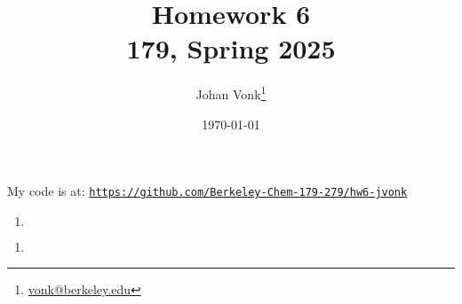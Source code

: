 \documentclass[10pt]{article}
\title{Homework 6\\\large  179, Spring 2025}
\author{Johan Vonk\thanks{\href{mailto:vonk@berkeley.edu}{vonk@berkeley.edu}}}
\date{\today}
\begin{document}
    \maketitle
    My code is at: \href{https://github.com/Berkeley-Chem-179-279/hw6-jvonk}{\texttt{https://github.com/Berkeley-Chem-179-279/hw6-jvonk}}\\
    \begin{problems}
        \item \begin{enumerate}
            \item \begin{align*}
            \end{align*}
        \end{enumerate}
        \item \begin{enumerate}
            \item
        \end{enumerate}
    \end{problems}
\end{document}

